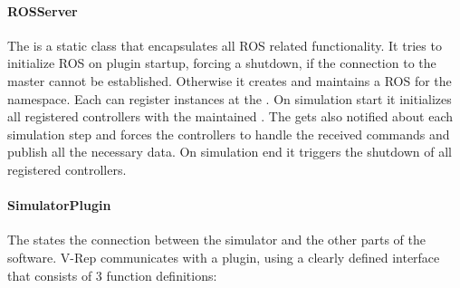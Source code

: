 \paragraph{ROSServer}

The  is a static class that encapsulates all ROS related functionality. It tries to initialize ROS on plugin startup, forcing a shutdown, if the connection to the master cannot be established. Otherwise it creates and maintains a ROS  for the  namespace. Each  can register  instances at the . On simulation start it initializes all registered controllers with the maintained . The  gets also notified about each simulation step and forces the controllers to handle the received commands and publish all the necessary data. On simulation end it triggers the shutdown of all registered controllers.

\paragraph{SimulatorPlugin}

The  states the connection between the simulator and the other parts of the software. V-Rep communicates with a plugin, using a clearly defined interface that consists of 3 function definitions:

